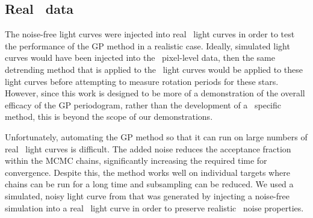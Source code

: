 \subsection{Real \kepler\ data}

The noise-free light curves were injected into real \kepler\ light curves in
order to test the performance of the GP method in a realistic case.
Ideally, simulated light curves would have been injected into the \kepler\
pixel-level data, then the same detrending method that is applied to the
\kepler\ light curves would be applied to these light curves before attempting
to measure rotation periods for these stars.
However, since this work is designed to be more of a demonstration of the
overall efficacy of the GP periodogram, rather than the development of a
\Kepler\ specific method, this is beyond the scope of our demonstrations.

Unfortunately, automating the GP method so that it can run on large numbers of
real \kepler\ light curves is difficult.
The added noise reduces the acceptance fraction within the MCMC chains,
significantly increasing the required time for convergence.
Despite this, the method works well on individual targets where chains can be
run for a long time and subsampling can be reduced.
We used a simulated, noisy light curve from \citet{Aigrain2015} that was
generated by injecting a noise-free simulation into a real \kepler\ light
curve in order to preserve realistic \kepler\ noise properties.


